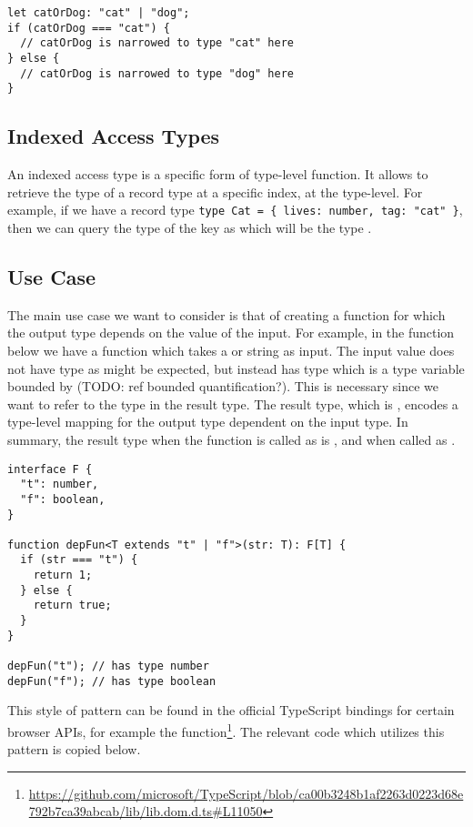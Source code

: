 \begin{lstlisting}
let catOrDog: "cat" | "dog";
if (catOrDog === "cat") {
  // catOrDog is narrowed to type "cat" here
} else {
  // catOrDog is narrowed to type "dog" here
}
\end{lstlisting}

\subsection{Indexed Access Types}

An indexed access type is a specific form of type-level function. It allows to retrieve the type of a record type at a specific index, at the type-level. For example, if we have a record type \lstinline+type Cat = { lives: number, tag: "cat"+\ \lstinline+}+, then we can query the type of the key  as  which will be the type .

\subsection{Use Case}

The main use case we want to consider is that of creating a function for which the output type depends on the value of the input. For example, in the  function below we have a function which takes a  or  string as input. The input value  does not have type  as might be expected, but instead has type  which is a type variable bounded by  (TODO: ref bounded quantification?). This is necessary since we want to refer to the type  in the result type. The result type, which is , encodes a type-level mapping for the output type dependent on the input type. In summary, the result type when the function is called as  is , and  when called as .

\begin{lstlisting}
interface F {
  "t": number,
  "f": boolean,
}

function depFun<T extends "t" | "f">(str: T): F[T] {
  if (str === "t") {
    return 1;
  } else {
    return true;
  }
}

depFun("t"); // has type number
depFun("f"); // has type boolean
\end{lstlisting}

This style of pattern can be found in the official TypeScript bindings for certain browser APIs, for example the  function\footnote{\url{https://github.com/microsoft/TypeScript/blob/ca00b3248b1af2263d0223d68e792b7ca39abcab/lib/lib.dom.d.ts\#L11050}}. The relevant code which utilizes this pattern is copied below.

